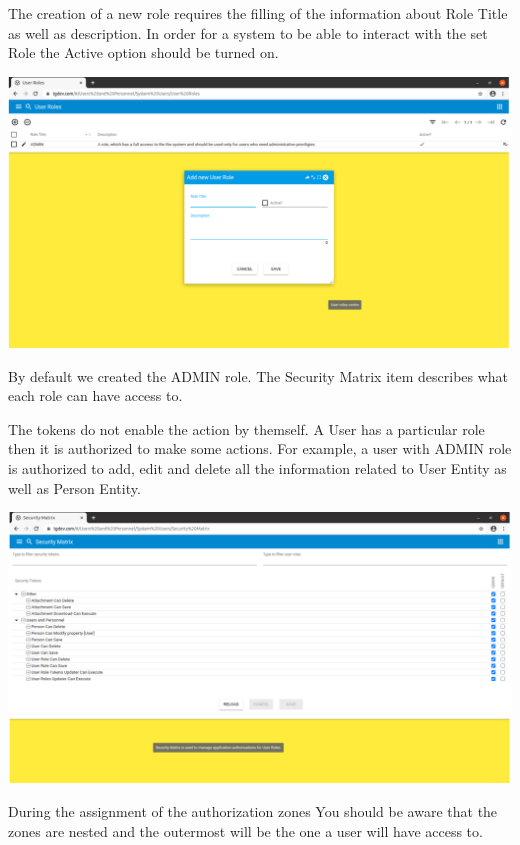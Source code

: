 The creation of a new role requires the filling of the information about Role Title as well as description. In order for a system to be able to interact with the set Role the Active option should be turned on.


\includegraphics[width=\textwidth]{sections/01-chapter/images/system4.png}

By default we created the ADMIN role. 
The Security Matrix item describes what each role can have access to. 

The tokens do not enable the action by themself. A User has a particular role then it is authorized to make some actions. For example, a user with ADMIN role is authorized to add, edit and delete all the information related to User Entity as well as Person Entity.  

\includegraphics[width=\textwidth]{sections/01-chapter/images/system5.png}

During the assignment of the authorization zones You should be aware that the zones are nested and the outermost will be the one a user will have access to. 


